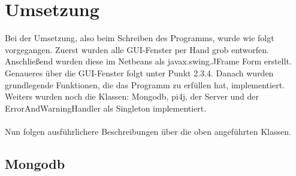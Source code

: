 \newpage

\section{Umsetzung}
Bei der Umsetzung, also beim Schreiben des Programms, wurde wie folgt vorgegangen. Zuerst wurden alle \ac{GUI}-Fenster per Hand grob entworfen. Anschließend wurden diese im Netbeans als javax.swing.JFrame Form erstellt. Genaueres über die \ac{GUI}-Fenster folgt unter Punkt 2.3.4. Danach wurden grundlegende Funktionen, die das Programm zu erfüllen hat, implementiert. Weiters wurden noch die Klassen: Mongodb, \ac{pi4j}, der Server und der ErrorAndWarningHandler als Singleton implementiert. 
\\ \\ 
Nun folgen ausführlichere Beschreibungen über die oben angeführten Klassen.

\subsection{Mongodb}
